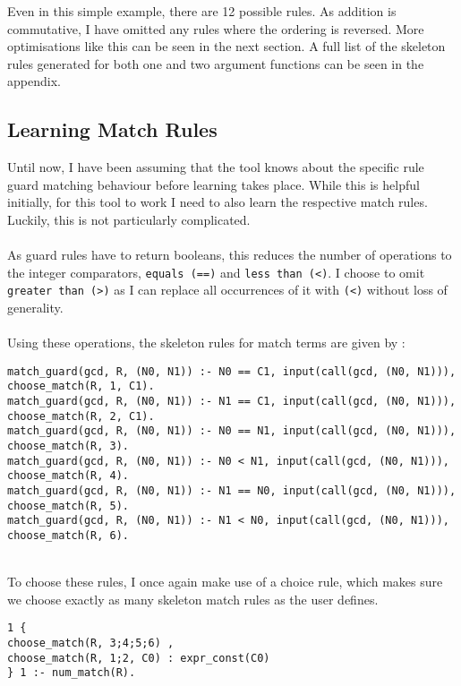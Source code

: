 Even in this simple example, there are 12 possible rules. As addition is commutative, I have omitted any rules where the ordering is reversed. More optimisations like this can be seen in the next section.
A full list of the skeleton rules generated for both one and two argument functions can be seen in the appendix.

\subsection{Learning Match Rules}
Until now, I have been assuming that the tool knows about the specific rule guard matching behaviour before learning takes place. While this is helpful initially, for this tool to work I need to also learn the respective match rules. Luckily, this is not particularly complicated. \\ \\
As guard rules have to return booleans, this reduces the number of operations to the integer comparators, \lstinline{equals (==)} and \lstinline{less than (<)}. I choose to omit \lstinline{greater than (>)} as I can replace all occurrences of it with \lstinline{(<)} without loss of generality.\\ \\
Using these operations, the skeleton rules for match terms are given by : \\

\begin{lstlisting}
match_guard(gcd, R, (N0, N1)) :- N0 == C1, input(call(gcd, (N0, N1))), choose_match(R, 1, C1).
match_guard(gcd, R, (N0, N1)) :- N1 == C1, input(call(gcd, (N0, N1))), choose_match(R, 2, C1).
match_guard(gcd, R, (N0, N1)) :- N0 == N1, input(call(gcd, (N0, N1))), choose_match(R, 3).
match_guard(gcd, R, (N0, N1)) :- N0 < N1, input(call(gcd, (N0, N1))), choose_match(R, 4).
match_guard(gcd, R, (N0, N1)) :- N1 == N0, input(call(gcd, (N0, N1))), choose_match(R, 5).
match_guard(gcd, R, (N0, N1)) :- N1 < N0, input(call(gcd, (N0, N1))), choose_match(R, 6).
\end{lstlisting}
\mbox{}\\
To choose these rules, I once again make use of a choice rule, which makes sure we choose exactly as many skeleton match rules as the user defines. \\

\begin{lstlisting}
1 {
choose_match(R, 3;4;5;6) ,
choose_match(R, 1;2, C0) : expr_const(C0)
} 1 :- num_match(R).
\end{lstlisting}

